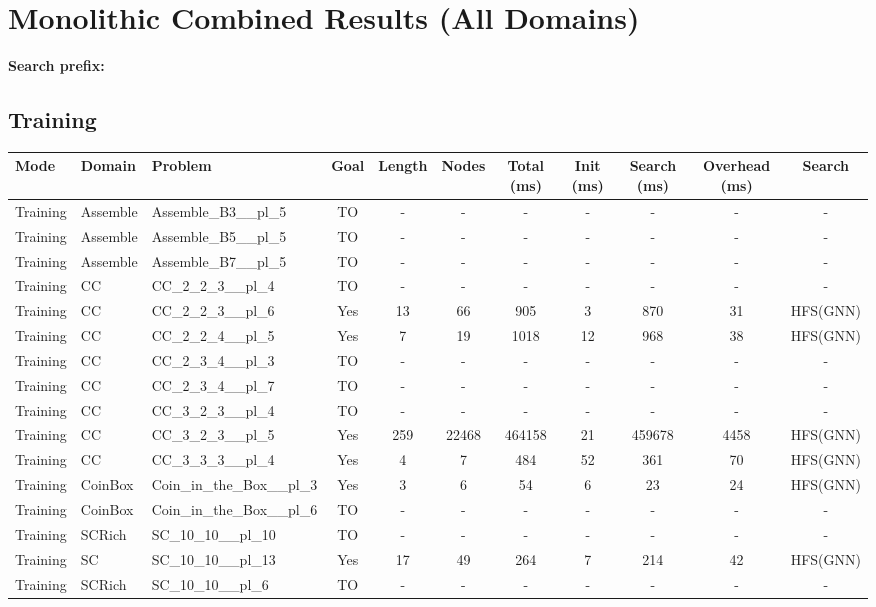 \documentclass{article}
\begin{document}
\section*{Monolithic Combined Results (All Domains)}
\textbf{Search prefix:} 
\\[0.5cm]
\subsection*{Training}
\begin{tabular}{lllcccccccc}
\toprule
Mode & Domain & Problem & Goal & Length & Nodes & Total (ms) & Init (ms) & Search (ms) & Overhead (ms) & Search \\
\midrule
Training & Assemble & Assemble\_B3\_\_pl\_5 & TO & - & - & - & - & - & - & - \\
Training & Assemble & Assemble\_B5\_\_pl\_5 & TO & - & - & - & - & - & - & - \\
Training & Assemble & Assemble\_B7\_\_pl\_5 & TO & - & - & - & - & - & - & - \\
Training & CC & CC\_2\_2\_3\_\_pl\_4 & TO & - & - & - & - & - & - & - \\
Training & CC & CC\_2\_2\_3\_\_pl\_6 & Yes & 13 & 66 & 905 & 3 & 870 & 31 & HFS(GNN) \\
Training & CC & CC\_2\_2\_4\_\_pl\_5 & Yes & 7 & 19 & 1018 & 12 & 968 & 38 & HFS(GNN) \\
Training & CC & CC\_2\_3\_4\_\_pl\_3 & TO & - & - & - & - & - & - & - \\
Training & CC & CC\_2\_3\_4\_\_pl\_7 & TO & - & - & - & - & - & - & - \\
Training & CC & CC\_3\_2\_3\_\_pl\_4 & TO & - & - & - & - & - & - & - \\
Training & CC & CC\_3\_2\_3\_\_pl\_5 & Yes & 259 & 22468 & 464158 & 21 & 459678 & 4458 & HFS(GNN) \\
Training & CC & CC\_3\_3\_3\_\_pl\_4 & Yes & 4 & 7 & 484 & 52 & 361 & 70 & HFS(GNN) \\
Training & CoinBox & Coin\_in\_the\_Box\_\_pl\_3 & Yes & 3 & 6 & 54 & 6 & 23 & 24 & HFS(GNN) \\
Training & CoinBox & Coin\_in\_the\_Box\_\_pl\_6 & TO & - & - & - & - & - & - & - \\
Training & SCRich & SC\_10\_10\_\_pl\_10 & TO & - & - & - & - & - & - & - \\
Training & SC & SC\_10\_10\_\_pl\_13 & Yes & 17 & 49 & 264 & 7 & 214 & 42 & HFS(GNN) \\
Training & SCRich & SC\_10\_10\_\_pl\_6 & TO & - & - & - & - & - & - & - \\

\end{tabular}
\end{document}
